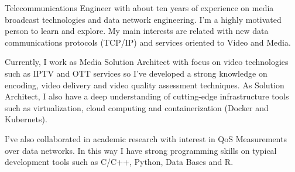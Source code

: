 \par{
Telecommunications Engineer with about ten years of experience on media broadcast technologies and data network engineering. I'm a highly motivated person to learn and explore. My main interests are related with new data communications protocols (TCP/IP) and services oriented to Video and Media.

Currently, I work as Media Solution Architect with focus on video technologies such as IPTV and OTT services so I've developed a strong knowledge on encoding, video delivery and video quality assessment techniques. As Solution Architect, I also have a deep understanding of cutting-edge infrastructure tools such as virtualization, cloud computing and containerization (Docker and Kubernets).

I've also collaborated in academic research with interest in QoS Measurements over data networks. In this way I have strong programming skills on typical development tools such as C/C++, Python, Data Bases and R.
}